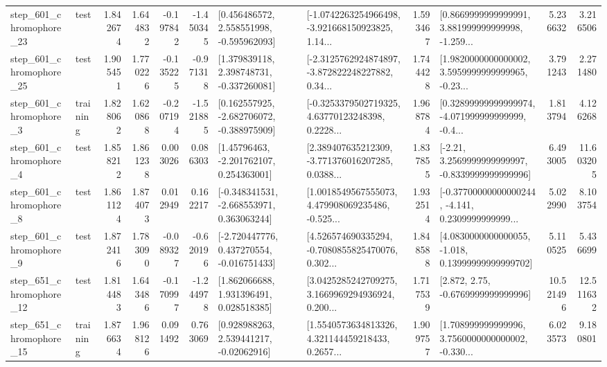 \begin{tabular}{llrrrrllrlrr}
  step\_601\_chromophore\_23 &      test &      1.842674 &    1.644832 &     -0.197842 & -1.450345 &    [0.456486572, 2.558551998, -0.595962093] &  [-1.0742263254966498, -3.921668150923825, 1.14... &       1.593467 &  [0.8669999999999991, 3.881999999999998, -1.259... &            5.236632 &          3.216506 \\
  step\_601\_chromophore\_25 &      test &      1.905451 &    1.770226 &     -0.135225 & -0.971318 &    [1.379839118, 2.398748731, -0.337260081] &  [-2.3125762924874897, -3.872822248227882, 0.34... &       1.744428 &  [1.9820000000000002, 3.5959999999999965, -0.23... &            3.791243 &          2.271480 \\
   step\_601\_chromophore\_3 &  training &      1.828062 &    1.620868 &     -0.207194 & -1.521885 &   [0.162557925, -2.682706072, -0.388975909] &  [-0.3253379502719325, 4.63770123248398, 0.2228... &       1.968784 &  [0.32899999999999974, -4.071999999999999, -0.4... &            1.813794 &          4.126268 \\
   step\_601\_chromophore\_4 &      test &      1.858212 &    1.861238 &      0.003026 &  0.086303 &     [1.45796463, -2.201762107, 0.254363001] &  [2.389407635212309, -3.771376016207285, 0.0388... &       1.837855 &   [-2.21, 3.2569999999999997, -0.8339999999999996] &            6.493005 &         11.603205 \\
   step\_601\_chromophore\_8 &      test &      1.861124 &    1.874073 &      0.012949 &  0.162217 &   [-0.348341531, -2.668553971, 0.363063244] &  [1.0018549567555073, 4.479908069235486, -0.525... &       1.932514 &  [-0.37700000000000244, -4.141, 0.2309999999999... &            5.022990 &          8.103754 \\
   step\_601\_chromophore\_9 &      test &      1.872416 &    1.783090 &     -0.089327 & -0.620196 &   [-2.720447776, 0.437270554, -0.016751433] &  [4.526574690335294, -0.7080855825470076, 0.302... &       1.848588 &  [4.0830000000000055, -1.018, 0.13999999999999702] &            5.110525 &          5.436699 \\
  step\_651\_chromophore\_12 &      test &      1.814483 &    1.643486 &     -0.170997 & -1.244978 &     [1.862066688, 1.931396491, 0.028518385] &  [3.0425285242709275, 3.1669969294936924, 0.200... &       1.717539 &                 [2.872, 2.75, -0.6769999999999996] &           10.521496 &         12.511632 \\
  step\_651\_chromophore\_15 &  training &      1.876634 &    1.968126 &      0.091492 &  0.763069 &     [0.928988263, 2.539441217, -0.02062916] &  [1.5540573634813326, 4.321144459218433, 0.2657... &       1.909757 &  [1.708999999999996, 3.7560000000000002, -0.330... &            6.023573 &          9.180801 \\

\end{tabular}
